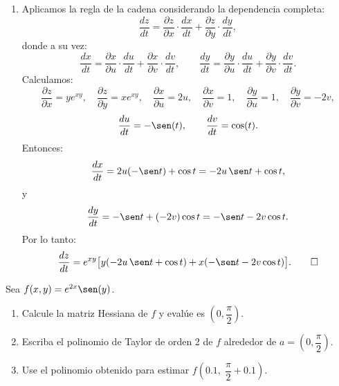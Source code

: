 \documentclass[11pt,respuestas,a4]{aleph-examen}
\begin{document}
\begin{preguntas}
\begin{respuesta}
\begin{enumerate}
    \item Aplicamos la regla de la cadena considerando la dependencia completa:
    \[
        \frac{dz}{dt}
        =
        \frac{\partial z}{\partial x}\cdot\frac{dx}{dt}
        +
        \frac{\partial z}{\partial y}\cdot\frac{dy}{dt},
    \]
    donde a su vez:
    \[
        \frac{dx}{dt}
        =
        \frac{\partial x}{\partial u}\cdot\frac{du}{dt}
        +
        \frac{\partial x}{\partial v}\cdot\frac{dv}{dt},
        \qquad
        \frac{dy}{dt}
        =
        \frac{\partial y}{\partial u}\cdot\frac{du}{dt}
        +
        \frac{\partial y}{\partial v}\cdot\frac{dv}{dt}.
    \]
    Calculamos:
    \[
        \frac{\partial z}{\partial x}=ye^{xy},\quad
        \frac{\partial z}{\partial y}=xe^{xy},\quad
        \frac{\partial x}{\partial u}=2u,\quad
        \frac{\partial x}{\partial v}=1,\quad
        \frac{\partial y}{\partial u}=1,\quad
        \frac{\partial y}{\partial v}=-2v,
    \]
    \[
        \frac{du}{dt}=-\sen(t),\qquad\frac{dv}{dt}=\cos(t).
    \]
    Entonces:
    \[
        \frac{dx}{dt}
        =
        2u(-\sen t)+\cos t
        =
        -2u\,\sen t+\cos t,
    \]
    y
    \[
        \frac{dy}{dt}
        =
        -\sen t+(-2v)\cos t
        =
        -\sen t-2v\cos t.
    \]
    Por lo tanto:
    \[
        \frac{dz}{dt}
        =
        e^{xy}\bigl[y(-2u\,\sen t+\cos t)+x(-\sen t-2v\cos t)\bigr].\qedhere
    \]
\end{enumerate}
\end{respuesta}


\item
Sea $f(x,y)=e^{2x}\sen(y)$.
\begin{enumerate}[leftmargin=*]
    \item Calcule la matriz Hessiana de $f$ y evalúe es $\left(0,\dfrac{\pi}{2}\right)$.
    \item Escriba el polinomio de Taylor de orden 2 de $f$ alrededor de $a=\!\left(0,\dfrac{\pi}{2}\right)$.
    \item Use el polinomio obtenido para estimar $f\!\left(0.1,\;\dfrac{\pi}{2}+0.1\right)$.
\end{enumerate}



\end{preguntas}
\end{document}
